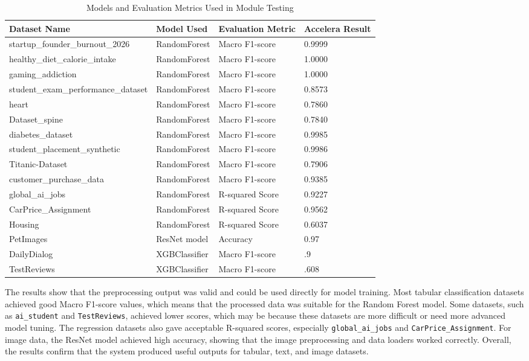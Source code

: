 \documentclass[12pt,a4paper]{report}
\begin{document}
\begin{table}[!htbp]
\centering
\small
\caption{Models and Evaluation Metrics Used in Module Testing}
\label{tab:module_testing_models}
\begin{tabular}{|p{7cm}|p{2.8cm}|p{3cm}|p{2cm}|}
\hline
\textbf{Dataset Name} & \textbf{Model Used} & \textbf{Evaluation Metric} & \textbf{Accelera Result} \\
\hline
startup\_founder\_burnout\_2026 & RandomForest & Macro F1-score & 0.9999 \\
\hline
healthy\_diet\_calorie\_intake & RandomForest & Macro F1-score & 1.0000 \\
\hline
gaming\_addiction & RandomForest & Macro F1-score & 1.0000 \\
\hline
student\_exam\_performance\_dataset & RandomForest & Macro F1-score & 0.8573 \\
\hline
heart & RandomForest & Macro F1-score & 0.7860 \\
\hline
Dataset\_spine & RandomForest & Macro F1-score & 0.7840 \\
\hline
diabetes\_dataset & RandomForest & Macro F1-score & 0.9985 \\
\hline
student\_placement\_synthetic & RandomForest & Macro F1-score & 0.9986 \\
\hline
Titanic-Dataset & RandomForest & Macro F1-score & 0.7906 \\
\hline
customer\_purchase\_data & RandomForest & Macro F1-score & 0.9385 \\
\hline
global\_ai\_jobs & RandomForest & R-squared Score & 0.9227 \\
\hline
CarPrice\_Assignment & RandomForest & R-squared Score & 0.9562 \\
\hline
Housing & RandomForest & R-squared Score & 0.6037 \\
\hline
PetImages & ResNet model & Accuracy & 0.97 \\
\hline
DailyDialog & XGBClassifier & Macro F1-score & .9 \\
\hline
TestReviews & XGBClassifier & Macro F1-score & .608 \\
\hline
\end{tabular}
\end{table}

The results show that the preprocessing output was valid and could be used directly for model training. Most tabular classification datasets achieved good Macro F1-score values, which means that the processed data was suitable for the Random Forest model. Some datasets, such as \texttt{ai\_student} and \texttt{TestReviews}, achieved lower scores, which may be because these datasets are more difficult or need more advanced model tuning.
The regression datasets also gave acceptable R-squared scores, especially \texttt{global\_ai\_jobs} and \texttt{CarPrice\_Assignment}. For image data, the ResNet model achieved high accuracy, showing that the image preprocessing and data loaders worked correctly. Overall, the results confirm that the system produced useful outputs for tabular, text, and image datasets.
\end{document}
